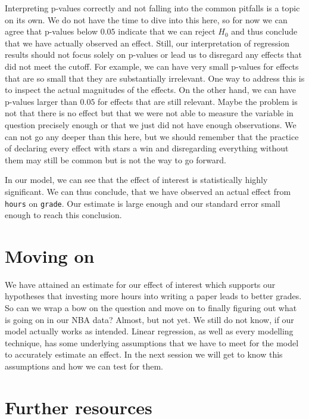 \documentclass[
]{book}
\begin{document}
Interpreting p-values correctly and not falling into the common pitfalls is a
topic on its own. We do not have the time to dive into this here, so for now we
can agree that p-values below \(0.05\) indicate that we can reject \(H_0\) and thus
conclude that we have actually observed an effect. Still, our interpretation of
regression results should not focus solely on p-values or lead us to disregard
any effects that did not meet the cutoff. For example, we can have very small
p-values for effects that are so small that they are substantially irrelevant.
One way to address this is to inspect the actual magnitudes of the effects.
On the other hand, we
can have p-values larger than \(0.05\) for effects that are still relevant. Maybe
the problem is not that there is no effect but that we were not able to measure
the variable in question precisely enough or that we just did not have enough
observations. We can not go any deeper than this here, but we should remember
that the practice of declaring every effect with stars a win and disregarding
everything without them may still be common but is not the way to go forward.

In our model, we can see that the effect of interest is statistically
highly significant. We can thus conclude, that we have observed an actual effect
from \texttt{hours} on \texttt{grade}. Our estimate is large enough and our standard error
small enough to reach this conclusion.

\hypertarget{moving-on-1}{%
\section{Moving on}\label{moving-on-1}}

We have attained an estimate for our effect of interest which supports our
hypotheses that investing more hours into writing a paper leads to better grades.
So can we wrap a bow on the question and move on to finally figuring out what
is going on in our NBA data? Almost, but not yet. We still do not know, if our
model actually works as intended. Linear regression, as well as every modelling
technique, has some underlying assumptions that we have to meet for the model
to accurately estimate an effect. In the next session we will get to know this
assumptions and how we can test for them.

\hypertarget{further-resources-2}{%
\section{Further resources}\label{further-resources-2}}
\end{document}
